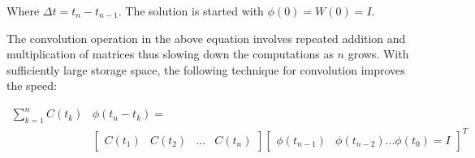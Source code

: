Where $\Delta t = t_n - t_{n-1}$. The solution is started with ${\phi(0)} = W(0) = I$.

The convolution operation in the above equation involves repeated addition and multiplication of matrices thus slowing down the computations as $n$ grows. With sufficiently large storage space, the following technique for convolution improves the speed:

\begin{align}
\sum\limits_{k = 1}^n C(t_k )&{\phi (t_n  - t_k )} = \nonumber \\
& \begin{bmatrix}
C(t_1) &  C(t_2) & ... & C(t_n)
\end{bmatrix}
 \begin{bmatrix}
{\phi(t_{n-1})} & {\phi(t_{n-2})} ... {\phi(t_0)}=I
\end{bmatrix}^T
\end{align}

